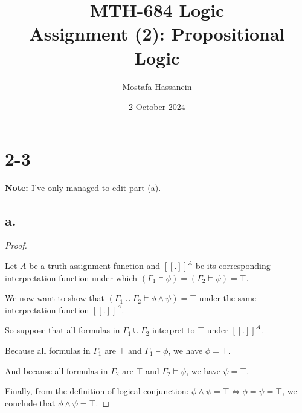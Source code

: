 \documentclass{article}
\author{Mostafa Hassanein}
\title{
  MTH-684 Logic \\
  Assignment (2): Propositional Logic}
\date{2 October 2024}
\begin{document}
\maketitle
\newpage

\section*{2-3}

\textbf{\underline{Note: }} I've only managed to edit part (a).


\subsection*{a.}
\begin{proof}
  $ $

  Let $A$ be a truth assignment function and $[[.]]^A$ be its corresponding interpretation function under which $(\Gamma_1 \models \phi) = (\Gamma_2 \models \psi) = \top$.
  \newline

  We now want to show that $(\Gamma_1 \cup \Gamma_2 \models \phi \land \psi) = \top$ under the same interpretation function $[[.]]^A$. 
    
  So suppose that all formulas in $\Gamma_1 \cup \Gamma_2$ interpret to $\top$ under $[[.]]^A$. 

  Because all formulas in $\Gamma_1$ are $\top$ and $\Gamma_1 \models \phi$, we have $\phi = \top$.

  And because all formulas in $\Gamma_2$ are $\top$ and $\Gamma_2 \models \psi$, we have $\psi = \top$.

  Finally, from the definition of logical conjunction: $\phi \land \psi = \top \iff \phi = \psi = \top$, we conclude that $\phi \land \psi = \top$.

\end{proof}
\end{document}
